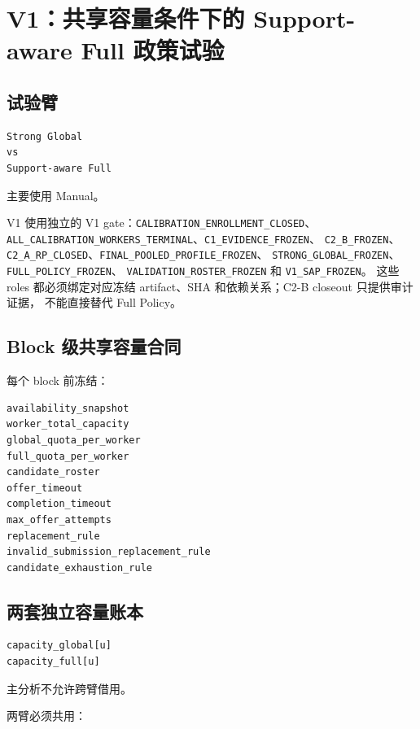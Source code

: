 \section{V1：共享容量条件下的 Support-aware Full 政策试验}

\subsection{试验臂}

\begin{verbatim}
Strong Global
vs
Support-aware Full
\end{verbatim}

主要使用 Manual。

V1 使用独立的 V1 gate：\texttt{CALIBRATION\_ENROLLMENT\_CLOSED}、
\texttt{ALL\_CALIBRATION\_WORKERS\_TERMINAL}、\texttt{C1\_EVIDENCE\_FROZEN}、
\texttt{C2\_B\_FROZEN}、\texttt{C2\_A\_RP\_CLOSED}、\texttt{FINAL\_POOLED\_PROFILE\_FROZEN}、
\texttt{STRONG\_GLOBAL\_FROZEN}、\texttt{FULL\_POLICY\_FROZEN}、
\texttt{VALIDATION\_ROSTER\_FROZEN} 和 \texttt{V1\_SAP\_FROZEN}。
这些 roles 都必须绑定对应冻结 artifact、SHA 和依赖关系；C2-B closeout 只提供审计证据，
不能直接替代 Full Policy。

\subsection{Block 级共享容量合同}

每个 block 前冻结：

\begin{verbatim}
availability_snapshot
worker_total_capacity
global_quota_per_worker
full_quota_per_worker
candidate_roster
offer_timeout
completion_timeout
max_offer_attempts
replacement_rule
invalid_submission_replacement_rule
candidate_exhaustion_rule
\end{verbatim}

\subsection{两套独立容量账本}

\begin{verbatim}
capacity_global[u]
capacity_full[u]
\end{verbatim}

主分析不允许跨臂借用。

两臂必须共用：

